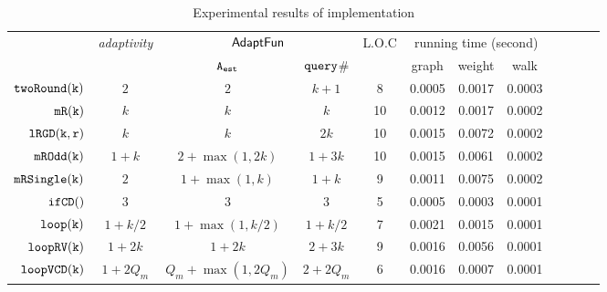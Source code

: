 {\footnotesize
\begin {table}[H]
\vspace{-0.4cm}
    \caption{Experimental results of {\THESYSTEM} implementation}
    \vspace{-0.5cm}
        \label{tb:adapt-imp}
        \begin{center}
        \centering
{\tiny
        \begin{tabular}{| >{\tiny}r | c | c | c | c | c | c | c | c | c | c | c }
         \hline \hline
        \multirow{2}{*}{Program $c$} & 
        \multirow{2}{*}{\emph{adaptivity}}
         & \multicolumn{2}{c|}{$\textsf{AdaptFun}$}
         & {L.O.C}
         & \multicolumn{3}{c|}{running time (second)} \\ 
         \cline{3-8}
         & & {${\mathtt{A_{est}}}$ } & {${\tt query}$\# } &  & graph & weight & walk \\ 
         \cline{6-8}
         \hline \hline
         $  \mathtt{twoRound(k)}$ & $2$ &  $2$ & $k+1 $  & 8 & 0.0005 & 0.0017 & 0.0003 \\
         $  \mathtt{mR(k)}$ & $k$ &  $k$ & $k$  &  10 & 0.0012 & 0.0017  & 0.0002 \\
         $  \mathtt{lRGD(k, r)}$ & $k$ & $k  $ & $ 2k $  &  10 & 0.0015 & 0.0072  & 0.0002  \\
         $  \mathtt{mROdd(k)}$ & $1 + k$ &  $2+\max(1,2k)  $ & $1 + 3 k  $  &  10 & 0.0015 & 0.0061  & 0.0002 \\
         $  \mathtt{mRSingle(k)}$    & $2$ &  $1+ \max(1, k) $ & $1 + k $  &  9 & 0.0011 & 0.0075  & 0.0002 \\
         $  \mathtt{ifCD()}$ & $3$ & $3 $ &   $3$  & 5 & 0.0005 & 0.0003   & 0.0001 \\
         $  \mathtt{loop(k)}$ & $1+k/2$ &   $1 +\max(1, k/2)  $  &  $1+k/2  $ & 7 & 0.0021 & 0.0015 &  0.0001 \\
         $  \mathtt{loopRV(k)}$ & $1 + 2k$ &  $1 + 2k$ & $2 + 3 k$  &  9 & 0.0016 & 0.0056 & 0.0001  \\
         $  {\mathtt{loopVCD(k)}} $ & ${1 + 2Q_m}$ &  ${Q_m+\max(1,2Q_m)}$  & $2+2Q_m$   &  6 & 0.0016 & 0.0007 & 0.0001 \\

\end{tabular}}
\end{center}
\end{table}}

